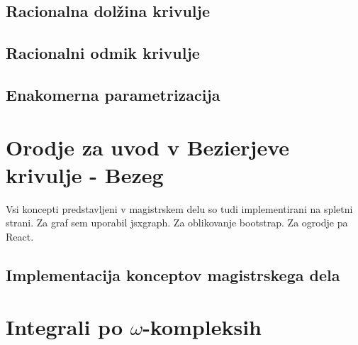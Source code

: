 \documentclass[isrm2, tisk]{fmfdelo}
\begin{document}
    \subsection{Racionalna dolžina krivulje}

    \subsection{Racionalni odmik krivulje}

    \subsection{Enakomerna parametrizacija}


    \section{Orodje za uvod v Bezierjeve krivulje - Bezeg}
    Vsi koncepti predstavljeni v magistrskem delu so tudi implementirani na spletni strani.
    Za graf sem uporabil jsxgraph. Za oblikovanje bootstrap. Za ogrodje pa React.

    \subsection{Implementacija konceptov magistrskega dela}






    \newpage



    \newpage
    \newpage
    \newpage


    \section{Integrali po \texorpdfstring{$\omega$}{ω}-kompleksih}
\end{document}
